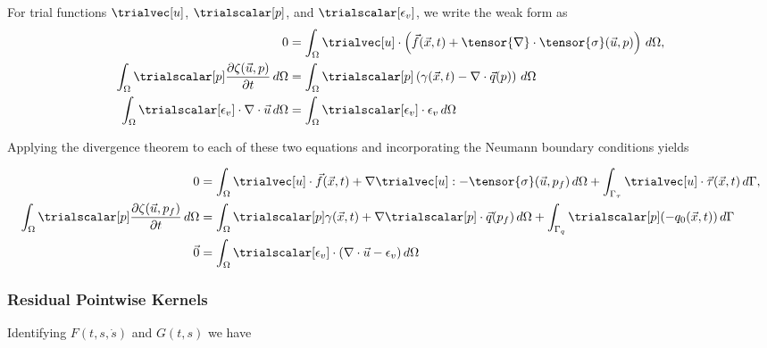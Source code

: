 For trial functions $\trialvec[u]$, $\trialscalar[p]$, and $\trialscalar[\epsilon_{v}]$, we write the weak form as
\begin{align}
0 &= \int_\Omega \trialvec[u] \cdot \left( \vec{f}(\vec{x},t) + \tensor{\nabla} \cdot \tensor{\sigma} (\vec{u},p) \right) \, d\Omega, \\
\int_\Omega  \trialscalar[p] \frac{\partial \zeta(\vec{u},p)}{\partial t} \, d\Omega &= \int_\Omega \trialscalar[p] \left(\gamma(\vec{x},t) - \nabla \cdot \vec{q}(p)\right) \, d\Omega \\
\int_{\Omega} \trialscalar[\epsilon_{v}]\cdot \nabla \cdot \vec{u} \, d\Omega &= \int_{\Omega} \trialscalar[\epsilon_{v}] \cdot \epsilon_{v} \, d\Omega
\end{align}

Applying the divergence theorem to each of these two equations and incorporating the Neumann
boundary conditions
yields

\begin{align}
0 &= \int_\Omega \trialvec[u] \cdot \vec{f}(\vec{x},t) + \nabla \trialvec[u] : -\tensor{\sigma}(\vec{u},p_f) \,
d\Omega + \int_{\Gamma_\tau} \trialvec[u] \cdot \vec{\tau}(\vec{x},t) \, d\Gamma, \\
 \int_\Omega  \trialscalar[p] \frac{\partial \zeta(\vec{u},p_f)}{\partial t} \, d\Omega &=
 \int_\Omega \trialscalar[p] \gamma(\vec{x},t) + \nabla \trialscalar[p] \cdot \vec{q}(p_f) \,
d\Omega + \int_{\Gamma_q} \trialscalar[p] (-q_0(\vec{x},t)) \, d\Gamma \\
\vec{0} &= \int_{\Omega} \trialscalar[\epsilon_{v}] \cdot \left(\nabla \cdot \vec{u} - \epsilon_{v} \right) d\Omega
\end{align}

\subsubsection{Residual Pointwise Kernels}

Identifying $F(t,s,\dot{s})$ and $G(t,s)$ we have


